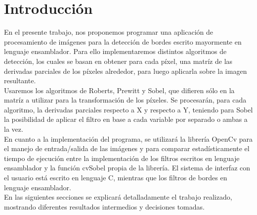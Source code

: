 \section{Introducci\'on}

En el presente trabajo, nos proponemos programar una aplicaci\'on de procesamiento de im\'agenes para la detecci\'on 
de bordes escrito mayormente en lenguaje ensamblador. Para ello implementaremos distintos algoritmos de detecci\'on,
los cuales se basan en obtener para cada p\'ixel, una matr\'iz de las derivadas parciales de los p\'ixeles alrededor, 
para luego aplicarla sobre la imagen resultante. \\
	

Usaremos los algoritmos de Roberts, Prewitt y Sobel, que difieren s\'olo en la matr\'iz a utilizar para la 
transformaci\'on de los p\'ixeles.  Se procesar\'an, para cada algoritmo, la derivadas parciales respecto a X y 
respecto a Y, teniendo para Sobel la posibilidad de aplicar el filtro en base a cada variable por separado 
o ambas a la vez. \\

En cuanto a la implementaci\'on del programa, se utilizar\'a la librer\'ia OpenCv para el manejo de entrada/salida de 
las im\'agenes y para comparar estad\'isticamente el tiempo de ejecuci\'on entre la implementaci\'on de los filtros 
escritos en lenguaje ensamblador y la funci\'on cvSobel propia de la librer\'ia. El sistema de interfaz con el 
usuario est\'a escrito en lenguaje C, mientras que los filtros de bordes en lenguaje ensamblador. \\

En las siguientes secciones se explicar\'a detalladamente el trabajo realizado, mostrando diferentes resultados 
intermedios y decisiones tomadas.

\pagebreak
